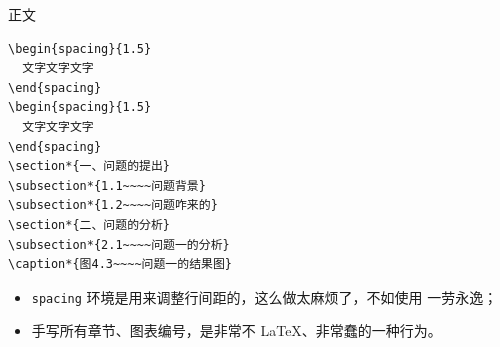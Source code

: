 \documentclass[aspectratio=169,fontset=none]{ctexbeamer}
\begin{document}
  \begin{frame}[fragile]{正文}
    \begin{minipage}[t]{0.5\textwidth}
      \begin{verbatim}
\begin{spacing}{1.5}
  文字文字文字
\end{spacing}
\begin{spacing}{1.5}
  文字文字文字
\end{spacing}
\section*{一、问题的提出}
\subsection*{1.1~~~~问题背景}
\subsection*{1.2~~~~问题咋来的}
\section*{二、问题的分析}
\subsection*{2.1~~~~问题一的分析}
\caption*{图4.3~~~~问题一的结果图}
      \end{verbatim}
    \end{minipage}%
    \begin{minipage}[t]{0.5\textwidth}
      \begin{itemize}
        \item \texttt{spacing} 环境是用来调整行间距的，这么做太麻烦了，不如使用 \texttt{\linespread} 一劳永逸；
        \item 手写所有章节、图表编号，是非常不 \LaTeX{}、非常蠢的一种行为。
      \end{itemize}
    \end{minipage}
  \end{frame}
\end{document}
